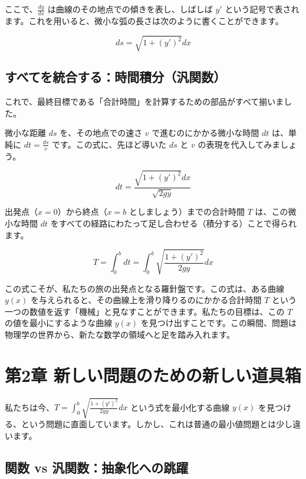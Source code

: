 \documentclass[12pt,a4paper]{ltjsarticle}
\begin{document}
ここで、$\frac{dy}{dx}$ は曲線のその地点での傾きを表し、しばしば $y'$ という記号で表されます。これを用いると、微小な弧の長さは次のように書くことができます。

\begin{equation}
ds = \sqrt{1 + (y')^2} dx
\end{equation}

\subsection{すべてを統合する：時間積分（汎関数）}

これで、最終目標である「合計時間」を計算するための部品がすべて揃いました。

微小な距離 $ds$ を、その地点での速さ $v$ で進むのにかかる微小な時間 $dt$ は、単純に $dt = \frac{ds}{v}$ です。この式に、先ほど導いた $ds$ と $v$ の表現を代入してみましょう。

\begin{equation}
dt = \frac{\sqrt{1 + (y')^2} dx}{\sqrt{2gy}}
\end{equation}

出発点（$x=0$）から終点（$x=b$ としましょう）までの合計時間 $T$ は、この微小な時間 $dt$ をすべての経路にわたって足し合わせる（積分する）ことで得られます。

\begin{equation}
T = \int_0^b dt = \int_0^b \sqrt{\frac{1 + (y')^2}{2gy}} dx
\end{equation}

この式こそが、私たちの旅の出発点となる羅針盤です。この式は、ある曲線 $y(x)$ を与えられると、その曲線上を滑り降りるのにかかる合計時間 $T$ という一つの数値を返す「機械」と見なすことができます。私たちの目標は、この $T$ の値を最小にするような曲線 $y(x)$ を見つけ出すことです。この瞬間、問題は物理学の世界から、新たな数学の領域へと足を踏み入れます。

\section{第2章 新しい問題のための新しい道具箱}

私たちは今、$T = \int_0^b \sqrt{\frac{1 + (y')^2}{2gy}} dx$ という式を最小化する曲線 $y(x)$ を見つける、という問題に直面しています。しかし、これは普通の最小値問題とは少し違います。

\subsection{関数 vs 汎関数：抽象化への跳躍}
\end{document}
